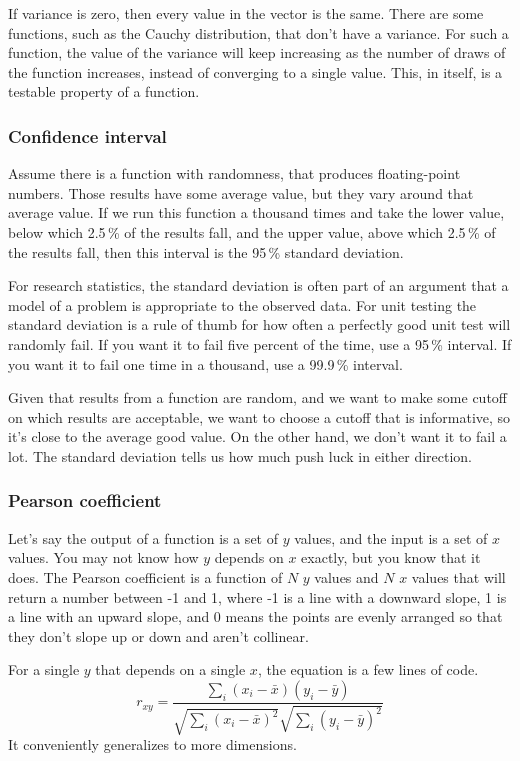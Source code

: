 \documentclass[fleqn,10pt]{olplainarticle}
\begin{document}
If variance is zero, then every value in the vector is
the same. There are some functions, such as the Cauchy
distribution, that don't have a variance. For such a function,
the value of the variance will keep increasing as the
number of draws of the function increases, instead of
converging to a single value. This, in itself, is a
testable property of a function.


\subsubsection{Confidence interval}

Assume there is a function with randomness, that produces floating-point numbers. Those results
have some average value, but they vary around that average value.
If we run this function a thousand times and take the
lower value, below which 2.5\,\% of the results fall,
and the upper value, above which 2.5\,\% of the results fall,
then this interval is the 95\,\% standard deviation.

For research statistics, the standard deviation is often part
of an argument that a model of a problem is appropriate to
the observed data. For unit testing the standard deviation
is a rule of thumb for how often a perfectly good unit test
will randomly fail. If you want it to fail five percent of
the time, use a 95\,\% interval. If you want it to fail
one time in a thousand, use a 99.9\,\% interval.

Given that results from a function are random, and we
want to make some cutoff on which results are acceptable,
we want to choose a cutoff that is informative, so it's
close to the average good value. On the other hand, we don't
want it to fail a lot. The standard deviation tells us
how much push luck in either direction.

\subsubsection{Pearson coefficient}
Let's say the output of a function is a set of $y$ values,
and the input is a set of $x$ values. You may not know
how $y$ depends on $x$ exactly, but you know that it
does. The Pearson coefficient is a function of
$N$ $y$ values and $N$ $x$ values that will return a number
between -1 and 1, where -1 is a line with a downward slope,
1 is a line with an upward slope, and 0 means the points
are evenly arranged so that they don't slope up or down
and aren't collinear.

For a single $y$ that depends on a single $x$, the equation
is a few lines of code.
\begin{equation}
r_{xy} = \frac{\sum_i (x_i - \bar{x})(y_i - \bar{y})}{\sqrt{\sum_i (x_i - \bar{x})^2}\sqrt{\sum_i(y_i - \bar{y})^2}}
\end{equation}
It conveniently generalizes to more dimensions.
\end{document}
